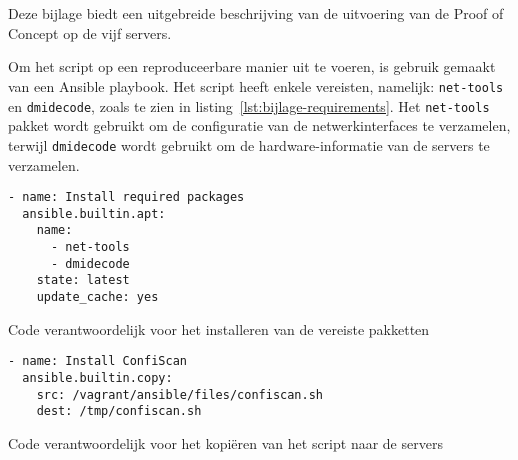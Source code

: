 
\chapter{}
\label{ch:bijlage_poc_uitvoering}

Deze bijlage biedt een uitgebreide beschrijving van de uitvoering van de Proof of Concept op de vijf servers.

Om het script op een reproduceerbare manier uit te voeren, is gebruik gemaakt van een Ansible playbook.
Het script heeft enkele vereisten, namelijk: \texttt{net-tools} en \texttt{dmidecode}, zoals te zien in listing~\ref{lst:bijlage-requirements}.
Het \texttt{net-tools} pakket wordt gebruikt om de configuratie van de netwerkinterfaces te verzamelen, terwijl \texttt{dmidecode} wordt gebruikt om de hardware-informatie van de servers te verzamelen.

\begin{listing}
  \begin{verbatim}
- name: Install required packages
  ansible.builtin.apt:
    name:
      - net-tools
      - dmidecode
    state: latest
    update_cache: yes
  \end{verbatim}
  \caption[Installatie van vereiste pakketten.]{Code verantwoordelijk voor het installeren van de vereiste pakketten}
  \label{lst:bijlage-requirements}
\end{listing}

\begin{listing}
  \begin{verbatim}
- name: Install ConfiScan
  ansible.builtin.copy:
    src: /vagrant/ansible/files/confiscan.sh
    dest: /tmp/confiscan.sh
  \end{verbatim}
  \caption[Kopi\"{e}ren van script naar servers.]{Code verantwoordelijk voor het kopiëren van het script naar de servers}
  \label{lst:bijlage-copy-script}
\end{listing}

